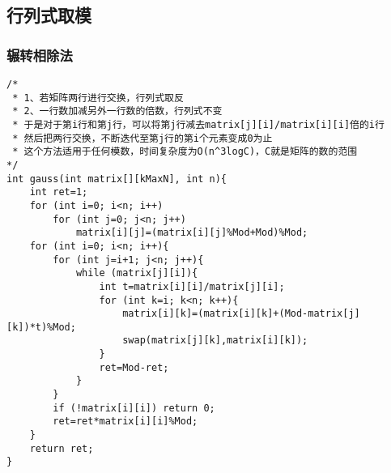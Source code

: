 \subsection{行列式取模}

\subsubsection{辗转相除法}
\begin{verbatim}
/*
 * 1、若矩阵两行进行交换，行列式取反
 * 2、一行数加减另外一行数的倍数，行列式不变
 * 于是对于第i行和第j行，可以将第j行减去matrix[j][i]/matrix[i][i]倍的i行
 * 然后把两行交换，不断迭代至第j行的第i个元素变成0为止
 * 这个方法适用于任何模数，时间复杂度为O(n^3logC)，C就是矩阵的数的范围
*/
int gauss(int matrix[][kMaxN], int n){
    int ret=1;
    for (int i=0; i<n; i++)
        for (int j=0; j<n; j++)
            matrix[i][j]=(matrix[i][j]%Mod+Mod)%Mod;
    for (int i=0; i<n; i++){
        for (int j=i+1; j<n; j++){
            while (matrix[j][i]){
                int t=matrix[i][i]/matrix[j][i];
                for (int k=i; k<n; k++){
                    matrix[i][k]=(matrix[i][k]+(Mod-matrix[j][k])*t)%Mod;
                    swap(matrix[j][k],matrix[i][k]);
                }
                ret=Mod-ret;
            }
        }
        if (!matrix[i][i]) return 0;
        ret=ret*matrix[i][i]%Mod;
    }
    return ret;
}
\end{verbatim}

~\\
~\\
